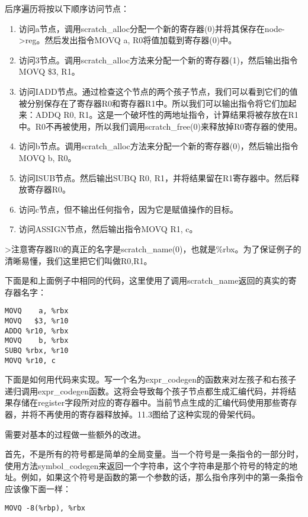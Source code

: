 \documentclass[cn,11pt,chinese]{elegantbook}
\begin{document}
后序遍历将按以下顺序访问节点：

\begin{enumerate}
  \item 访问a节点，调用scratch\_alloc分配一个新的寄存器(0)并将其保存在node->reg。然后发出指令MOVQ a, R0将值加载到寄存器(0)中。
  \item 访问3节点。调用scratch\_alloc方法来分配一个新的寄存器(1)，然后输出指令MOVQ \$3, R1。
  \item 访问IADD节点。通过检查这个节点的两个孩子节点，我们可以看到它们的值被分别保存在了寄存器R0和寄存器R1中。所以我们可以输出指令将它们加起来：ADDQ R0, R1。这是一个破坏性的两地址指令，计算结果将被存放在R1中。R0不再被使用，所以我们调用scratch\_free(0)来释放掉R0寄存器的使用。
  \item 访问b节点。调用scratch\_alloc方法来分配一个新的寄存器(0)，然后输出指令MOVQ b, R0。
  \item 访问ISUB节点。然后输出SUBQ R0, R1，并将结果留在R1寄存器中。然后释放寄存器R0。
  \item 访问c节点，但不输出任何指令，因为它是赋值操作的目标。
  \item 访问ASSIGN节点，然后输出指令MOVQ R1, c。
\end{enumerate}

>注意寄存器R0的真正的名字是scratch\_name(0)，也就是\%rbx。为了保证例子的清晰易懂，我们这里把它们叫做R0,R1。

下面是和上面例子中相同的代码，这里使用了调用scratch\_name返回的真实的寄存器名字：

\begin{verbatim}
MOVQ    a, %rbx
MOVQ   $3, %r10
ADDQ %r10, %rbx
MOVQ    b, %rbx
SUBQ %rbx, %r10
MOVQ %r10, c
\end{verbatim}

下面是如何用代码来实现。写一个名为expr\_codegen的函数来对左孩子和右孩子递归调用expr\_codegen函数。这将会导致每个孩子节点都生成汇编代码，并将结果存储在register字段所对应的寄存器中。当前节点生成的汇编代码使用那些寄存器，并将不再使用的寄存器释放掉。11.3图给了这种实现的骨架代码。

需要对基本的过程做一些额外的改进。

首先，不是所有的符号都是简单的全局变量。当一个符号是一条指令的一部分时，使用方法symbol\_codegen来返回一个字符串，这个字符串是那个符号的特定的地址。例如，如果这个符号是函数的第一个参数的话，那么指令序列中的第一条指令应该像下面一样：

\begin{verbatim}
MOVQ -8(%rbp), %rbx
\end{verbatim}
\end{document}
